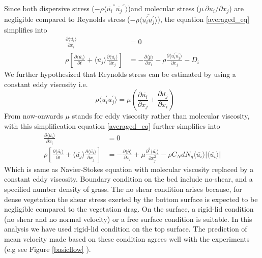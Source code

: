 \documentclass[12pt]{report}   %
\newcommand{\del}{\partial}
\renewcommand{\bar}{\overline}
\begin{document}
Since both dispersive stress ($-\rho \langle \bar{u_i}^{''} \bar{u_j}^{''} \rangle $)and molecular stress ($ \mu\ \del u_i / \del x_j $) are negligible compared to Reynolds stress ($-\rho \langle\bar{ u_i^{'} u_j^{'} } \rangle $), the equation \ref{averaged_eq} simplifies into
 \begin{equation}\label{averaged_eq2}
  \begin{split}
  \frac{\partial \langle \bar{u_i} \rangle}{\partial x_i}&=0 \\
 \rho \left[ \frac{\partial \langle \overline{u_i} \rangle }{\partial t}+ \langle \overline{u_j} \rangle \frac{\partial \langle \bar{u_i} \rangle}{\partial x_j} \right ] &= -\frac{\partial \langle \bar{p} \rangle  }{\partial x_i} -\rho \frac{\partial \langle \bar{u_i^{'}u_j^{'}} \rangle }{\partial x_j} -D_i
 \end{split}
\end{equation}
We further hypothesized that Reynolds stress can be estimated by using a constant eddy viscosity i.e. 
\[ -\rho \langle u_i^{'} u_j^{'} \rangle = \mu \left(\frac{\del \bar{u_i} }{\del x_j} + \frac{\del \bar {u_j} }{\del x_i}  \right)\]
From now-onwards $\mu$ stands for eddy viscosity rather than molecular viscosity, with this simplification equation \ref{averaged_eq} further simplifies into
 \begin{equation}\label{averaged_eq3}
  \begin{split}
  \frac{\partial \langle \bar{u_i} \rangle}{\partial x_i}&=0 \\
 \rho \left[ \frac{\partial \langle \overline{u_i} \rangle }{\partial t}+ \langle \overline{u_j} \rangle \frac{\partial \langle \bar{u_i} \rangle}{\partial x_j} \right ] &= -\frac{\partial \langle \bar{p} \rangle  }{\partial x_i} +\mu \frac{\partial^2 \langle \bar{u_i} \rangle }{\partial x_j^2} -\rho C_N d N_g \langle \overline{u_i}\rangle |\langle \overline{u_i} \rangle|
 \end{split}
\end{equation}
Which is same as Navier-Stokes equation with molecular viscosity replaced by a constant eddy viscosity. Boundary condition on the bed include no-shear, and a specified number density of grass. The no shear condition arises because, for dense vegetation the shear stress exerted by the bottom surface is expected to be negligible compared to the vegetation drag. On the surface, a rigid-lid condition (no shear and no normal velocity) or a free surface condition is suitable. In this analysis we have used rigid-lid condition on the top surface. The prediction of mean velocity made based on these condition agrees well with the experiments (e.g see Figure \ref{basicflow} ). 
%
\clearpage{\pagestyle{empty}\cleardoublepage}
\end{document}
